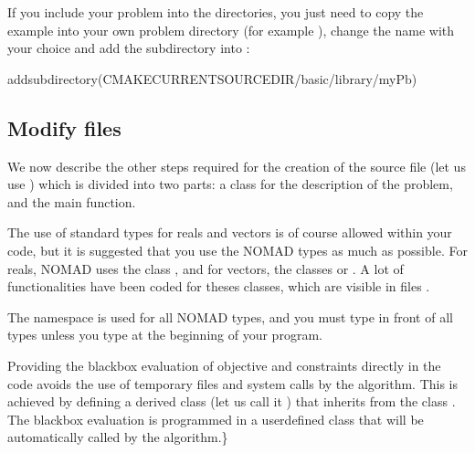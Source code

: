 \documentclass[letterpaper,10pt,english]{sphinxmanual}
\begin{document}
\sphinxAtStartPar
If you include your problem into the  directories, you just need to copy
the example  into your own problem directory (for example ),
change the name  with your choice and add the subdirectory into :

\begin{sphinxVerbatim}[commandchars=\\\{\}]
add\PYGZus{}subdirectory(\PYGZdl{}\PYGZob{}CMAKE\PYGZus{}CURRENT\PYGZus{}SOURCE\PYGZus{}DIR\PYGZcb{}/basic/library/myPb)
\end{sphinxVerbatim}


\subsection{Modify  files}
\label{\detokenize{LibraryMode:modify-c-files}}
\sphinxAtStartPar
We now describe the other steps required for the creation of the source file (let us use )
which is divided into two parts: a class for the description of the problem, and the main function.

\sphinxAtStartPar
The use of standard  types for reals and vectors is of course allowed within your code, but it
is suggested that you use the NOMAD types as much as  possible. For reals, NOMAD uses the class ,
and for vectors, the classes  or .
A lot of functionalities have been coded for theses classes, which are visible  in files .

\sphinxAtStartPar
The namespace  is used for all NOMAD types, and you must type  in front of all types unless you type   at the beginning of your program.

\sphinxAtStartPar
Providing the blackbox evaluation of objective and constraints directly in the code avoids
the use of temporary files and system calls by the algorithm. This is achieved by defining a derived
class (let us call it ) that inherits from the class .
The blackbox evaluation is programmed in a user\sphinxhyphen{}defined class that will  be automatically called by the algorithm.\}
\end{document}
